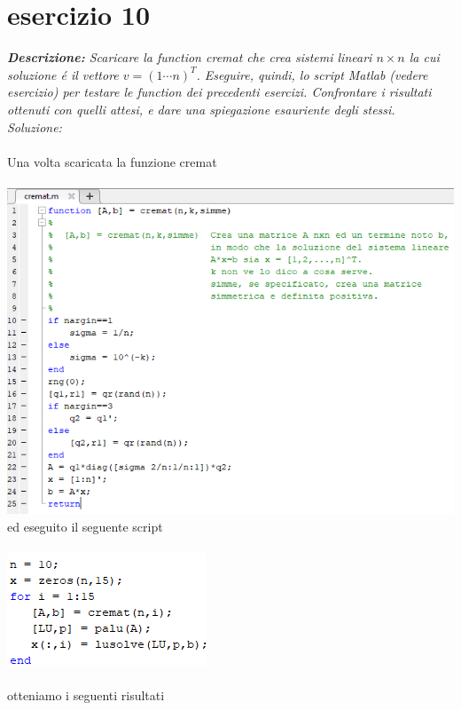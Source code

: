 \section{esercizio 10}
\textit{\textbf{Descrizione:} Scaricare la function cremat che crea sistemi lineari $n \times n$ la cui soluzione \'e il vettore $v = (1 \cdots n)^{T}$. Eseguire, quindi, lo script Matlab (vedere esercizio) per testare le function dei precedenti esercizi. Confrontare i risultati ottenuti con quelli attesi, e dare una spiegazione esauriente degli stessi.}\newline
\noindent\emph{Soluzione: }
\\~\\
Una volta scaricata la funzione cremat
\\~\\
\includegraphics[width=1.3\linewidth]{img/cremat.png}\newpage
ed eseguito il seguente script
\\~\\
\includegraphics[width=.5\linewidth]{img/ex10.png}
\\~\\
otteniamo i seguenti risultati
\\~\\
